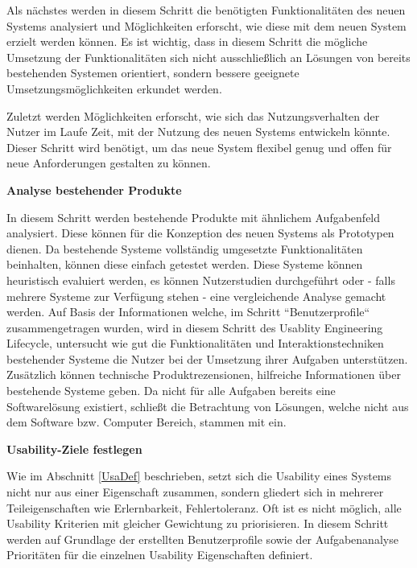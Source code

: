 \cite[S.~77]{Nielsen1994} Als nächstes werden in diesem Schritt die benötigten Funktionalitäten des neuen Systems analysiert und Möglichkeiten erforscht, wie diese mit dem neuen System erzielt werden können. 
Es ist wichtig, dass in diesem Schritt die mögliche Umsetzung der Funktionalitäten sich nicht ausschließlich an Lösungen von bereits bestehenden Systemen orientiert, sondern 
bessere geeignete Umsetzungsmöglichkeiten erkundet werden.

\cite[S.~78]{Nielsen1994} Zuletzt werden Möglichkeiten erforscht, wie sich das Nutzungsverhalten der Nutzer im Laufe Zeit, mit der Nutzung des neuen Systems entwickeln könnte. Dieser Schritt wird  
benötigt, um das neue System flexibel genug und offen für neue Anforderungen gestalten zu können. 

\vspace{5mm} 
\textbf{Analyse bestehender Produkte} 
 
\cite[S.~78]{Nielsen1994} In diesem Schritt werden bestehende Produkte mit ähnlichem Aufgabenfeld analysiert. Diese können für die Konzeption des neuen Systems als Prototypen dienen. 
Da bestehende Systeme vollständig umgesetzte Funktionalitäten beinhalten, können diese einfach getestet werden.    
Diese Systeme können heuristisch evaluiert werden, es können Nutzerstudien durchgeführt oder - falls mehrere Systeme zur Verfügung stehen - eine vergleichende Analyse gemacht werden. Auf Basis der Informationen welche, im Schritt ``Benutzerprofile`` zusammengetragen wurden, wird in diesem Schritt des Usablity Engineering Lifecycle, untersucht wie gut die Funktionalitäten und Interaktionstechniken 
bestehender Systeme die Nutzer bei der Umsetzung ihrer Aufgaben unterstützen. Zusätzlich können technische Produktrezensionen, hilfreiche Informationen über bestehende Systeme geben. 
Da nicht für alle Aufgaben bereits eine Softwarelösung existiert, schließt \citeauthor{Nielsen1994} die Betrachtung von Lösungen, welche nicht aus dem Software bzw. Computer Bereich, stammen mit ein. 

\vspace{5mm} 
\textbf{Usability-Ziele festlegen} 

Wie im Abschnitt \ref{UsaDef} beschrieben, setzt sich die Usability eines Systems nicht nur aus einer Eigenschaft zusammen, sondern gliedert sich in mehrerer Teileigenschaften wie Erlernbarkeit, Fehlertoleranz. \cite[S.~79]{Nielsen1994} Oft ist es nicht möglich, alle Usability Kriterien mit gleicher Gewichtung zu priorisieren. In diesem Schritt werden auf Grundlage der erstellten Benutzerprofile sowie der Aufgabenanalyse Prioritäten für die einzelnen Usability Eigenschaften definiert. 

